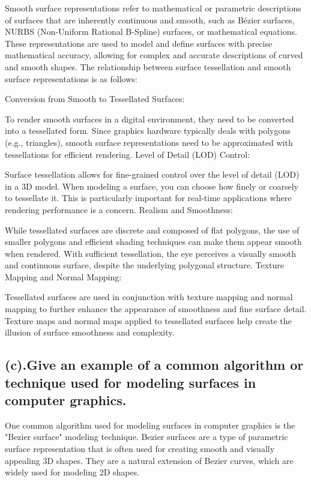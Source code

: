 \documentclass{article}
\begin{document}
\begin{itemize}
Smooth surface representations refer to mathematical or parametric descriptions of surfaces that are inherently continuous and smooth, such as Bézier surfaces, NURBS (Non-Uniform Rational B-Spline) surfaces, or mathematical equations.
These representations are used to model and define surfaces with precise mathematical accuracy, allowing for complex and accurate descriptions of curved and smooth shapes.
The relationship between surface tessellation and smooth surface representations is as follows:

Conversion from Smooth to Tessellated Surfaces:

To render smooth surfaces in a digital environment, they need to be converted into a tessellated form. Since graphics hardware typically deals with polygons (e.g., triangles), smooth surface representations need to be approximated with tessellations for efficient rendering.
Level of Detail (LOD) Control:

Surface tessellation allows for fine-grained control over the level of detail (LOD) in a 3D model. When modeling a surface, you can choose how finely or coarsely to tessellate it. This is particularly important for real-time applications where rendering performance is a concern.
Realism and Smoothness:

While tessellated surfaces are discrete and composed of flat polygons, the use of smaller polygons and efficient shading techniques can make them appear smooth when rendered. With sufficient tessellation, the eye perceives a visually smooth and continuous surface, despite the underlying polygonal structure.
Texture Mapping and Normal Mapping:

Tessellated surfaces are used in conjunction with texture mapping and normal mapping to further enhance the appearance of smoothness and fine surface detail. Texture maps and normal maps applied to tessellated surfaces help create the illusion of surface smoothness and complexity.
\subsection{(c).Give an example of a common algorithm or technique used for modeling surfaces in computer graphics.}
One common algorithm used for modeling surfaces in computer graphics is the "Bezier surface" modeling technique. Bezier surfaces are a type of parametric surface representation that is often used for creating smooth and visually appealing 3D shapes. They are a natural extension of Bezier curves, which are widely used for modeling 2D shapes.


\end{itemize}
\end{document}
